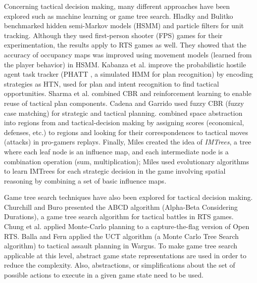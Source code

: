\documentclass[journal]{IEEEtran}
\begin{document}
Concerning tactical decision making, many different approaches have been explored such as machine learning or game tree search. 
Hladky and Bulitko \cite{Hladky2008} benchmarked hidden semi-Markov models (HSMM) and particle filters for unit tracking. Although they used first-person shooter (FPS) games for their experimentation, the results apply to RTS games as well. They showed that the accuracy of occupancy maps was improved using movement models (learned from the player behavior) in HSMM. Kabanza et al. \cite{OBRecog} improve the probabilistic hostile agent task tracker (PHATT \cite{PHATT}, a simulated HMM for plan recognition) by encoding strategies as HTN, used for plan and intent recognition to find tactical opportunities. Sharma et al. \cite{CBR-RL} combined CBR and reinforcement learning to enable reuse of tactical plan components. Cadena and Garrido \cite{CadenaG11} used fuzzy CBR (fuzzy case matching) for strategic and tactical planning. \cite{SynnaeveTactics} combined space abstraction into regions from \cite{Perkins10} and tactical-decision making by assigning scores (economical, defenses, etc.) to regions and looking for their correspondences to tactical moves (attacks) in pro-gamers replays.
Finally, Miles \cite{miles2006co} created the idea of {\em IMTrees}, a tree where each leaf node is an influence map, and each intermediate node is a combination operation (sum, multiplication); Miles used evolutionary algorithms to learn IMTrees for each strategic decision in the game involving spatial reasoning by combining a set of basic influence maps.

Game tree search techniques have also been explored for tactical decision making. Churchill and Buro \cite{churchill2012fast} presented the ABCD algorithm (Alpha-Beta Considering Durations), a game tree search algorithm for tactical battles in RTS games. Chung et al. \cite{Chung05} applied Monte-Carlo planning to a capture-the-flag version of Open RTS. Balla and Fern \cite{UCT} applied the UCT algorithm (a Monte Carlo Tree Search algorithm) to tactical assault planning in Wargus. To make game tree search applicable at this level, abstract game state representations are used in order to reduce the complexity. Also, abstractions, or simplifications about the set of possible actions to execute in a given game state need to be used.

\end{document}
